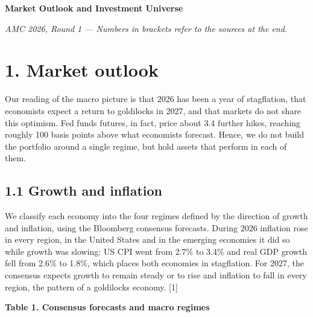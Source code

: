 \documentclass[
]{article}
\author{}
\date{}
\begin{document}
\begin{center}
{\Large\textbf{Market Outlook and Investment Universe}}

\emph{AMC 2026, Round 1 --- Numbers in brackets refer to the sources at
the end.}
\end{center}

\hypertarget{market-outlook}{%
\section{1. Market outlook}\label{market-outlook}}

Our reading of the macro picture is that 2026 has been a year of
stagflation, that economists expect a return to goldilocks in 2027, and
that markets do not share this optimism. Fed funds futures, in fact,
price about 3.4 further hikes, reaching roughly 100 basis points above
what economists forecast. Hence, we do not build the portfolio around a
single regime, but hold assets that perform in each of them.

\hypertarget{growth-and-inflation}{%
\subsection{1.1 Growth and inflation}\label{growth-and-inflation}}

We classify each economy into the four regimes defined by the direction
of growth and inflation, using the Bloomberg consensus forecasts. During
2026 inflation rose in every region, in the United States and in the
emerging economies it did so while growth was slowing: US CPI went from
2.7\% to 3.4\% and real GDP growth fell from 2.6\% to 1.8\%, which
places both economies in stagflation. For 2027, the consensus expects
growth to remain steady or to rise and inflation to fall in every
region, the pattern of a goldilocks economy. {[}1{]}

\textbf{Table 1. Consensus forecasts and macro regimes}
\end{document}
